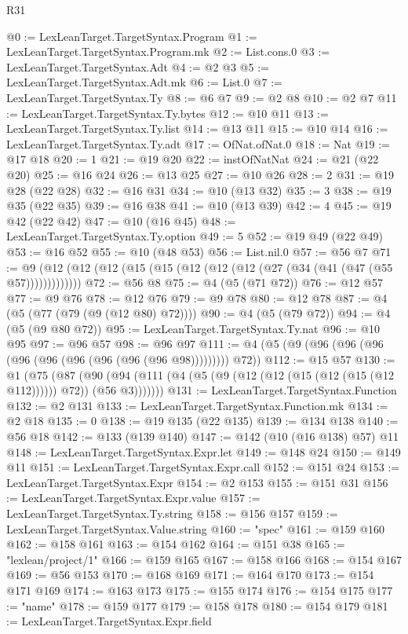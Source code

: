 \begin{lexlean}{R31}
\begin{coremodule}
@0 := LexLeanTarget.TargetSyntax.Program
@1 := LexLeanTarget.TargetSyntax.Program.mk
@2 := List.cons.{0}
@3 := LexLeanTarget.TargetSyntax.Adt
@4 := @2 @3
@5 := LexLeanTarget.TargetSyntax.Adt.mk
@6 := List.{0}
@7 := LexLeanTarget.TargetSyntax.Ty
@8 := @6 @7
@9 := @2 @8
@10 := @2 @7
@11 := LexLeanTarget.TargetSyntax.Ty.bytes
@12 := @10 @11
@13 := LexLeanTarget.TargetSyntax.Ty.list
@14 := @13 @11
@15 := @10 @14
@16 := LexLeanTarget.TargetSyntax.Ty.adt
@17 := OfNat.ofNat.{0}
@18 := Nat
@19 := @17 @18
@20 := 1
@21 := @19 @20
@22 := instOfNatNat
@24 := @21 (@22 @20)
@25 := @16 @24
@26 := @13 @25
@27 := @10 @26
@28 := 2
@31 := @19 @28 (@22 @28)
@32 := @16 @31
@34 := @10 (@13 @32)
@35 := 3
@38 := @19 @35 (@22 @35)
@39 := @16 @38
@41 := @10 (@13 @39)
@42 := 4
@45 := @19 @42 (@22 @42)
@47 := @10 (@16 @45)
@48 := LexLeanTarget.TargetSyntax.Ty.option
@49 := 5
@52 := @19 @49 (@22 @49)
@53 := @16 @52
@55 := @10 (@48 @53)
@56 := List.nil.{0}
@57 := @56 @7
@71 := @9 (@12 (@12 (@12 (@15 (@15 (@12 (@12 (@12 (@27 (@34 (@41 (@47 (@55 @57)))))))))))))
@72 := @56 @8
@75 := @4 (@5 (@71 @72))
@76 := @12 @57
@77 := @9 @76
@78 := @12 @76
@79 := @9 @78
@80 := @12 @78
@87 := @4 (@5 (@77 (@79 (@9 (@12 @80) @72))))
@90 := @4 (@5 (@79 @72))
@94 := @4 (@5 (@9 @80 @72))
@95 := LexLeanTarget.TargetSyntax.Ty.nat
@96 := @10 @95
@97 := @96 @57
@98 := @96 @97
@111 := @4 (@5 (@9 (@96 (@96 (@96 (@96 (@96 (@96 (@96 (@96 (@96 @98))))))))) @72))
@112 := @15 @57
@130 := @1
    (@75
      (@87 (@90 (@94 (@111 (@4 (@5 (@9 (@12 (@12 (@15 (@12 (@15 (@12 @112)))))) @72)) (@56 @3)))))))
@131 := LexLeanTarget.TargetSyntax.Function
@132 := @2 @131
@133 := LexLeanTarget.TargetSyntax.Function.mk
@134 := @2 @18
@135 := 0
@138 := @19 @135 (@22 @135)
@139 := @134 @138
@140 := @56 @18
@142 := @133 (@139 @140)
@147 := @142 (@10 (@16 @138) @57) @11
@148 := LexLeanTarget.TargetSyntax.Expr.let
@149 := @148 @24
@150 := @149 @11
@151 := LexLeanTarget.TargetSyntax.Expr.call
@152 := @151 @24
@153 := LexLeanTarget.TargetSyntax.Expr
@154 := @2 @153
@155 := @151 @31
@156 := LexLeanTarget.TargetSyntax.Expr.value
@157 := LexLeanTarget.TargetSyntax.Ty.string
@158 := @156 @157
@159 := LexLeanTarget.TargetSyntax.Value.string
@160 := "spec"
@161 := @159 @160
@162 := @158 @161
@163 := @154 @162
@164 := @151 @38
@165 := "lexlean/project/1"
@166 := @159 @165
@167 := @158 @166
@168 := @154 @167
@169 := @56 @153
@170 := @168 @169
@171 := @164 @170
@173 := @154 @171 @169
@174 := @163 @173
@175 := @155 @174
@176 := @154 @175
@177 := "name"
@178 := @159 @177
@179 := @158 @178
@180 := @154 @179
@181 := LexLeanTarget.TargetSyntax.Expr.field

\end{coremodule}
\end{lexlean}

